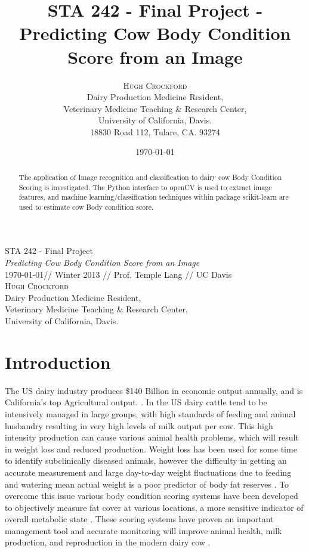 \documentclass[11pt]{article}
\title{STA 242 - Final Project - Predicting Cow Body Condition Score from an Image}
\author{\Large{\textsc{Hugh Crockford}}\vspace{0.25in}\\
	Dairy Production Medicine Resident,\\
	Veterinary Medicine Teaching \& Research Center,\\
	University of California, Davis.\\
	18830 Road 112, Tulare, CA. 93274\\
}
\date{\today}
\begin{document}
\begin{center}
	\vspace*{0.3in}
	\LARGE STA 242 - Final Project \\ 
	\Large \emph{Predicting Cow Body Condition Score from an Image} \\ 
	\vspace{0.25in}
	\normalsize \today  // Winter 2013 // Prof. Temple Lang // UC Davis\\ 
	\vspace{0.25in}
	\textsc{Hugh Crockford}\\
	\vspace{0.1in}
	Dairy Production Medicine Resident,\\
	Veterinary Medicine Teaching \& Research Center,\\
	University of California, Davis.\\
\end{center}


	\tableofcontents

	\begin{abstract}
		The application of Image recognition and classification to dairy cow Body Condition Scoring is investigated.
		The Python interface to openCV is used to extract image features, and machine learning/classification techniques within package scikit-learn are used to estimate cow Body condition score.
	\end{abstract}

\newpage
\section{Introduction}
		The US dairy industry produces \$140 Billion in economic output annually, and is California's top Agricultural output. \cite{cmab13}. 
		In the US dairy cattle tend to be intensively managed in large groups, with high standards of feeding and animal husbandry resulting in very high levels of milk output per cow.
		This high intensity production can cause various animal health problems, which will result in weight loss and reduced production.
		Weight loss has been used for some time to identify subclinically diseased animals, however the difficulty in getting an accurate measurement and large day-to-day weight fluctuations due to feeding and watering mean actual weight is a poor predictor of body fat reserves \cite{Roche2004}.
		To overcome this issue various body condition scoring systems have been developed to objectively measure fat cover at various locations, a more sensitive indicator of overall metabolic state \cite{Wildman1982}.
		These scoring systems have proven an important management tool and accurate monitoring will improve animal health, milk production, and reproduction in the modern dairy cow \cite{Buckley2003}.
\end{document}
